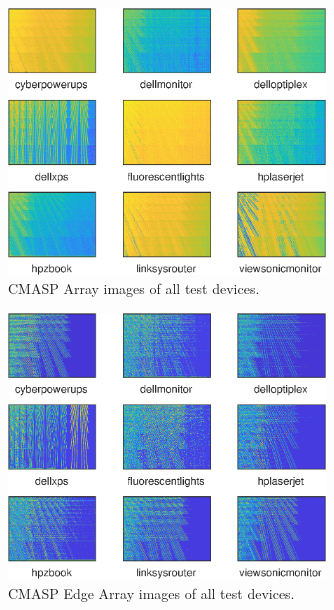 

\appendix
\label{appendix:DASP Image Appendix}                   

\begin{figure}[htp]
	\includegraphics[width=0.75\textwidth]{./dasp_algorithm_results/dasp_device_images_cmasp_array.eps}
	\centering
	\caption{CMASP Array images of all test devices.}
	\label{fig:dasp_device_image_cmasp_array}
\end{figure}

\begin{figure}[htp]
	\includegraphics[width=0.75\textwidth]{./dasp_algorithm_results/dasp_device_images_cmasp_edgearray.eps}
	\centering
	\caption{CMASP Edge Array images of all test devices.}
	\label{fig:dasp_device_image_cmasp_earray}
\end{figure}
